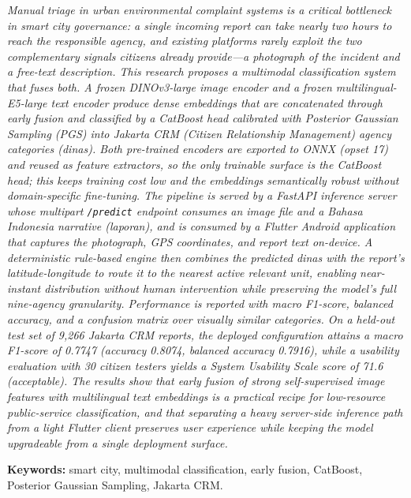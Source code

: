 {\selectfont\itshape{}
\noindent Manual triage in urban environmental complaint systems is a critical bottleneck in smart city governance: a single incoming report can take nearly two hours to reach the responsible agency, and existing platforms rarely exploit the two complementary signals citizens already provide---a photograph of the incident and a free-text description. This research proposes a multimodal classification system that fuses both. A frozen DINOv3-large image encoder and a frozen multilingual-E5-large text encoder produce dense embeddings that are concatenated through early fusion and classified by a CatBoost head calibrated with Posterior Gaussian Sampling (PGS) into Jakarta CRM (\textit{Citizen Relationship Management}) agency categories (\textit{dinas}). Both pre-trained encoders are exported to ONNX (\textit{opset} 17) and reused as feature extractors, so the only trainable surface is the CatBoost head; this keeps training cost low and the embeddings semantically robust without domain-specific fine-tuning. The pipeline is served by a FastAPI inference server whose multipart \texttt{/predict} endpoint consumes an image file and a Bahasa Indonesia narrative (\textit{laporan}), and is consumed by a Flutter Android application that captures the photograph, GPS coordinates, and report text on-device. A deterministic rule-based engine then combines the predicted dinas with the report's latitude-longitude to route it to the nearest active relevant unit, enabling near-instant distribution without human intervention while preserving the model's full nine-agency granularity. Performance is reported with macro F1-score, balanced accuracy, and a confusion matrix over visually similar categories. On a held-out test set of 9{,}266 Jakarta CRM reports, the deployed configuration attains a macro F1-score of 0.7747 (accuracy 0.8074, balanced accuracy 0.7916), while a usability evaluation with 30 citizen testers yields a System Usability Scale score of 71.6 (acceptable). The results show that early fusion of strong self-supervised image features with multilingual text embeddings is a practical recipe for low-resource public-service classification, and that separating a heavy server-side inference path from a light Flutter client preserves user experience while keeping the model upgradeable from a single deployment surface.

\noindent\textbf{Keywords:} smart city, multimodal classification, early fusion, CatBoost, Posterior Gaussian Sampling, Jakarta CRM.
}

